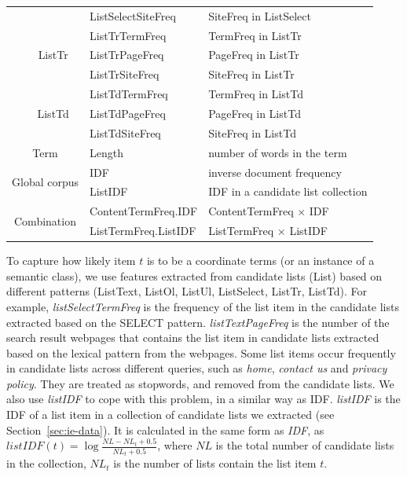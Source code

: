 \begin{table}[h!]
\begin{tabular}{|c|c|l|l|}
                  &                   &  ListSelectSiteFreq           & SiteFreq in ListSelect \\ \cline{2-4} 
                  & \multirow{3}{*}{ListTr} & ListTrTermFreq  & TermFreq in ListTr\\ 
                  &                   &  ListTrPageFreq       & PageFreq in ListTr \\ 
                  &                   &  ListTrSiteFreq       & SiteFreq in ListTr \\ \cline{2-4} 
                  & \multirow{3}{*}{ListTd} & ListTdTermFreq  & TermFreq in ListTd \\ 
                  &                   &  ListTdPageFreq       & PageFreq in ListTd \\ 
                  &                   &  ListTdSiteFreq       & SiteFreq in ListTd \\ \hline
\multicolumn{2}{|c|}{Term}                &  Length & number of words in the term \\ \hline
\multicolumn{2}{|c|}{\multirow{2}{*}{Global corpus}}   & IDF & inverse document frequency \\ 
\multicolumn{2}{|l|}{}                    &  ListIDF  & IDF in a candidate list collection \\  \hline
\multicolumn{2}{|c|}{\multirow{2}{*}{Combination}}   & ContentTermFreq.IDF &  ContentTermFreq $\times$ IDF \\ 
\multicolumn{2}{|l|}{}                    &  ListTermFreq.ListIDF & ListTermFreq $\times$ ListIDF \\  \hline
\end{tabular}
\end{table}


To capture how likely item $t$ is to be a coordinate terms (or an instance of a semantic class), we use features extracted from candidate lists (List) based on different patterns (ListText, ListOl, ListUl, ListSelect, ListTr, ListTd). For example, \textit{listSelectTermFreq} is the frequency of the list item in the candidate lists extracted based on the SELECT pattern. \textit{listTextPageFreq} is the number of the search result webpages that contains the list item in candidate lists extracted based on the lexical pattern from the webpages. Some list items occur frequently in candidate lists across different queries, such as \textit{home}, \textit{contact us} and \textit{privacy policy}. They are treated as stopwords, and removed from the candidate lists. We also use \textit{listIDF} to cope with this problem, in a similar way as IDF.  \textit{listIDF} is the IDF of a list item in a collection of candidate lists we extracted (see Section~\ref{sec:ie-data}). It is calculated in the same form as \textit{IDF}, 
as $listIDF(t)=\log{\frac{NL-NL_{t}+0.5}{NL_t+0.5}}$, where $NL$ is the total number of candidate lists in the collection,  $NL_t$ is the number of lists contain the list item $t$.


